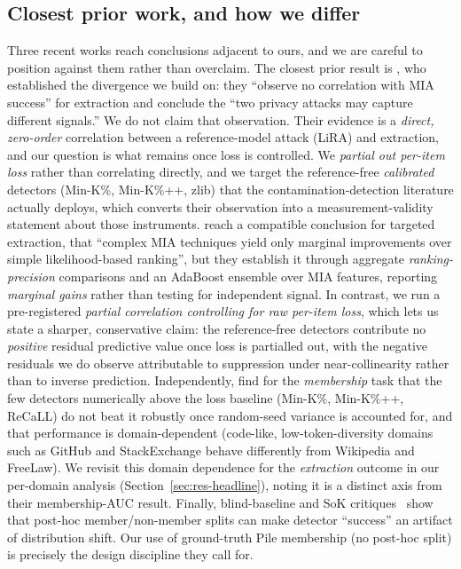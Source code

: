 \subsection{Closest prior work, and how we differ}
\label{sec:closest}
Three recent works reach conclusions adjacent to ours, and we are careful to position
against them rather than overclaim.
The closest prior result is \citet{hayes2025strong}, who established the divergence we
build on: they ``observe no correlation with MIA success'' for extraction and conclude
the ``two privacy attacks may capture different signals.'' We do not claim that
observation. Their evidence is a \emph{direct, zero-order} correlation between a
reference-model attack (LiRA) and extraction, and our question is what remains once loss
is controlled. We \emph{partial out per-item loss} rather than correlating directly, and
we target the reference-free \emph{calibrated} detectors (Min-K\%, Min-K\%++, zlib) that
the contamination-detection literature actually deploys, which converts their observation
into a measurement-validity statement about those instruments.
\citet{alsahili2025effectiveness}
reach a compatible conclusion for targeted extraction, that ``complex MIA techniques
yield only marginal improvements over simple likelihood-based ranking'', but they
establish it through aggregate \emph{ranking-precision} comparisons and an AdaBoost
ensemble over MIA features, reporting \emph{marginal gains} rather than testing for
independent signal. In contrast, we run a pre-registered \emph{partial correlation
controlling for raw per-item loss}, which lets us state a sharper, conservative claim:
the reference-free detectors contribute no \emph{positive} residual predictive value
once loss is partialled out, with the negative residuals we do observe attributable to
suppression under near-collinearity rather than to inverse prediction. Independently, \citet{chen2025statistical}
find for the \emph{membership} task that the few detectors
numerically above the loss baseline (Min-K\%, Min-K\%++, ReCaLL) do not beat it robustly
once random-seed variance is accounted for, and that performance is domain-dependent
(code-like, low-token-diversity domains such as GitHub and StackExchange behave
differently from Wikipedia and FreeLaw). We revisit this domain dependence for the
\emph{extraction} outcome in our per-domain analysis (Section~\ref{sec:res-headline}), noting it
is a distinct axis from their membership-AUC result. Finally, blind-baseline and SoK
critiques~\citep{das2024blind,meeus2025sok} show that post-hoc member/non-member splits can
make detector ``success'' an artifact of distribution shift. Our use of ground-truth Pile
membership (no post-hoc split) is precisely the design discipline they call for.

